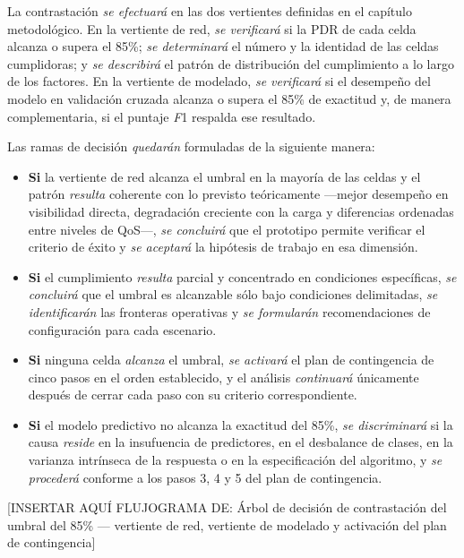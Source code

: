 \documentclass[
  12pt,
]{article}
\providecommand{\tightlist}{%
  \setlength{\itemsep}{0pt}\setlength{\parskip}{0pt}}
\begin{document}
La contrastación \emph{se efectuará} en las dos vertientes definidas en
el capítulo metodológico. En la vertiente de red, \emph{se verificará}
si la PDR de cada celda alcanza o supera el 85\%; \emph{se determinará}
el número y la identidad de las celdas cumplidoras; y \emph{se
describirá} el patrón de distribución del cumplimiento a lo largo de los
factores. En la vertiente de modelado, \emph{se verificará} si el
desempeño del modelo en validación cruzada alcanza o supera el 85\% de
exactitud y, de manera complementaria, si el puntaje \emph{F}1 respalda
ese resultado.

Las ramas de decisión \emph{quedarán} formuladas de la siguiente manera:

\begin{itemize}
\tightlist
\item
  \textbf{Si} la vertiente de red alcanza el umbral en la mayoría de las
  celdas y el patrón \emph{resulta} coherente con lo previsto
  teóricamente —mejor desempeño en visibilidad directa, degradación
  creciente con la carga y diferencias ordenadas entre niveles de QoS—,
  \emph{se concluirá} que el prototipo permite verificar el criterio de
  éxito y \emph{se aceptará} la hipótesis de trabajo en esa dimensión.
\item
  \textbf{Si} el cumplimiento \emph{resulta} parcial y concentrado en
  condiciones específicas, \emph{se concluirá} que el umbral es
  alcanzable sólo bajo condiciones delimitadas, \emph{se identificarán}
  las fronteras operativas y \emph{se formularán} recomendaciones de
  configuración para cada escenario.
\item
  \textbf{Si} ninguna celda \emph{alcanza} el umbral, \emph{se activará}
  el plan de contingencia de cinco pasos en el orden establecido, y el
  análisis \emph{continuará} únicamente después de cerrar cada paso con
  su criterio correspondiente.
\item
  \textbf{Si} el modelo predictivo no alcanza la exactitud del 85\%,
  \emph{se discriminará} si la causa \emph{reside} en la insufuencia de
  predictores, en el desbalance de clases, en la varianza intrínseca de
  la respuesta o en la especificación del algoritmo, y \emph{se
  procederá} conforme a los pasos 3, 4 y 5 del plan de contingencia.
\end{itemize}

{[}INSERTAR AQUÍ FLUJOGRAMA DE: Árbol de decisión de contrastación del
umbral del 85\% — vertiente de red, vertiente de modelado y activación
del plan de contingencia{]}
\end{document}
